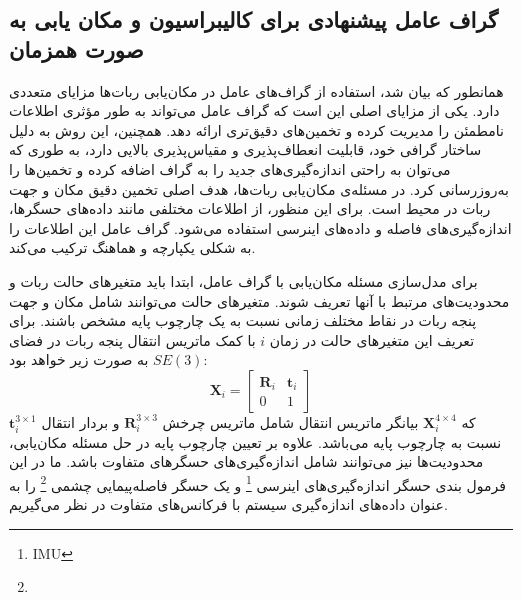 \subsection{گراف عامل پیشنهادی برای کالیبراسیون و مکان یابی به صورت همزمان}
  
همانطور که بیان شد، استفاده از گراف‌های عامل در مکان‌یابی ربات‌ها مزایای متعددی دارد. یکی از مزایای اصلی این است که گراف عامل می‌تواند به طور مؤثری اطلاعات نامطمئن را مدیریت کرده و تخمین‌های دقیق‌تری ارائه دهد. همچنین، این روش به دلیل ساختار گرافی خود، قابلیت انعطاف‌پذیری و مقیاس‌پذیری بالایی دارد، به طوری که می‌توان به راحتی اندازه‌گیری‌های جدید را به گراف اضافه کرده و تخمین‌ها را به‌روزرسانی کرد. در مسئله‌ی مکان‌یابی ربات‌ها، هدف اصلی تخمین دقیق مکان و جهت ربات در محیط است. برای این منظور، از اطلاعات مختلفی مانند داده‌های حسگرها، اندازه‌گیری‌های فاصله و داده‌های اینرسی استفاده می‌شود. گراف عامل این اطلاعات را به شکلی یکپارچه و هماهنگ ترکیب می‌کند.

برای مدل‌سازی مسئله مکان‌یابی با گراف عامل، ابتدا باید متغیرهای حالت ربات و محدودیت‌های مرتبط با آنها تعریف شوند. متغیرهای حالت می‌توانند شامل مکان و جهت پنجه ربات در نقاط مختلف زمانی نسبت به یک چارچوب پایه مشخص باشند. برای تعریف این متغیرهای حالت در زمان $i$ با کمک ماتریس انتقال پنجه ربات در فضای
$SE(3)$
به صورت زیر خواهد بود:
\begin{equation} \label{eq:transformation matrix}
	\boldsymbol{X}_i = \begin{bmatrix}
							\mathbf{R}_i & \mathbf{t}_i \\
								0 & 1
				     	\end{bmatrix}
\end{equation}
که 
$\boldsymbol{X}_i^{4\times4}$
 بیانگر ماتریس انتقال شامل ماتریس چرخش 
$\mathbf{R}_i^{3\times3}$
 و بردار انتقال 
 $ \mathbf{t}_i^{3\times1}$ 
 نسبت به چارچوب پایه می‌باشد. علاوه بر تعیین چارچوب پایه در حل مسئله مکان‌یابی، محدودیت‌ها نیز می‌توانند
شامل اندازه‌گیری‌های حسگرهای متفاوت باشد. 
 ما در این فرمول بندی
 حسگر اندازه‌گیری‌های اینرسی
\footnote{IMU} 
 و یک حسگر فاصله‌پیمایی چشمی
\footnote{}
را به عنوان داده‌های اندازه‌گیری سیستم با فرکانس‌های متفاوت در نظر می‌گیریم. 

